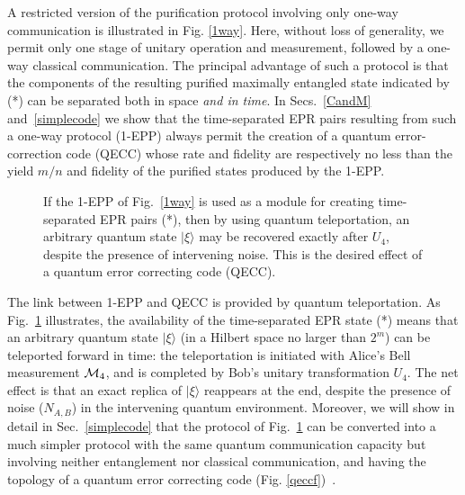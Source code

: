 A restricted version of the purification protocol involving only one-way
communication is illustrated in Fig. \ref{1way}.  Here, without loss of
generality, we permit only one stage of unitary operation and
measurement, followed by a  one-way classical communication.  The
principal advantage of such a protocol is that the components
of the resulting purified maximally entangled state indicated by (*) can
be separated both in space {\it and in time}. In
Secs.~\ref{CandM} and~\ref{simplecode}  we show that the 
time-separated EPR pairs
resulting from such a one-way protocol (1-EPP) always permit the
creation of a quantum error-correction code (QECC) whose rate and
fidelity are respectively no less than the yield $m/n$ and fidelity of
the purified states produced by the 1-EPP.
 
\begin{figure}[htbp]
\centerline{}
\caption[EPP6.eps 1EPP used as module]
{If the 1-EPP of Fig.~\protect\ref{1way} is used as a module
for creating time-separated EPR pairs (*), then by using quantum
teleportation\protect\cite{teleportation}, an arbitrary quantum state
$|\xi\rangle$ may be recovered exactly after $U_4$, despite the presence
of intervening noise.  This is the desired effect of a quantum error
correcting code (QECC).} \label{qecc}
\end{figure}
 
The link between 1-EPP and QECC is provided by quantum
teleportation\cite{teleportation}. As Fig.~\ref{qecc} illustrates, the
availability of the time-separated EPR state (*) means that an
arbitrary quantum state $|\xi\rangle$ (in a Hilbert space no larger
than $2^m$) can be teleported forward in time: the teleportation is
initiated with Alice's Bell measurement ${\cal M}_4$, and is completed by
Bob's unitary transformation $U_4$.  The net effect is that an exact
replica of $|\xi\rangle$ reappears at the end, despite the presence of
noise ($N_{A,B}$) in the intervening quantum
environment.  Moreover, we will show in detail in
Sec.~\ref{simplecode} that the protocol of Fig.~\ref{qecc} can be
converted into a much simpler protocol with the same quantum
communication capacity but involving neither entanglement nor
classical communication, and having the topology of a quantum error
correcting code (Fig.
\ref{qeccf})~\cite{ChuangLaf,shellgame,CS,Steane,Laflamme,EM,Sam,
balance,newest}.
 
